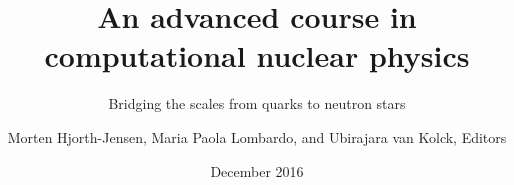 \documentclass[graybox,envcountchap]{svmult}
\begin{document}
\frontmatter

\begin{titlepage}
\title{An advanced course in computational nuclear physics}
 \subtitle{Bridging the scales from quarks to neutron stars}
\date{December 2016}
\author{Morten Hjorth-Jensen, Maria Paola Lombardo, and Ubirajara van Kolck, Editors}
\end{titlepage}



\tableofcontents
\mainmatter











\end{document}
